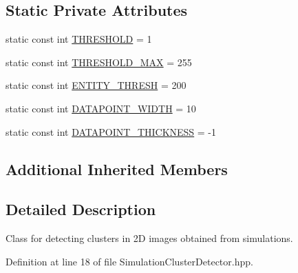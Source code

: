 \subsection*{Static Private Attributes}
\begin{DoxyCompactItemize}
\item 
static const int \hyperlink{classmultiscale_1_1analysis_1_1SimulationClusterDetector_a460525b4359afb52b4bde2ebd600122c}{T\-H\-R\-E\-S\-H\-O\-L\-D} = 1
\item 
static const int \hyperlink{classmultiscale_1_1analysis_1_1SimulationClusterDetector_a32b52c0ce7f8a1c8da872aa1cf754317}{T\-H\-R\-E\-S\-H\-O\-L\-D\-\_\-\-M\-A\-X} = 255
\item 
static const int \hyperlink{classmultiscale_1_1analysis_1_1SimulationClusterDetector_ad161524f0da7d2414e616fff59f02118}{E\-N\-T\-I\-T\-Y\-\_\-\-T\-H\-R\-E\-S\-H} = 200
\item 
static const int \hyperlink{classmultiscale_1_1analysis_1_1SimulationClusterDetector_a16d99d22863feed83960e6b9efe407a2}{D\-A\-T\-A\-P\-O\-I\-N\-T\-\_\-\-W\-I\-D\-T\-H} = 10
\item 
static const int \hyperlink{classmultiscale_1_1analysis_1_1SimulationClusterDetector_a530922a3fad1e612062d17d07e2dc763}{D\-A\-T\-A\-P\-O\-I\-N\-T\-\_\-\-T\-H\-I\-C\-K\-N\-E\-S\-S} = -\/1
\end{DoxyCompactItemize}
\subsection*{Additional Inherited Members}


\subsection{Detailed Description}
Class for detecting clusters in 2\-D images obtained from simulations. 

Definition at line 18 of file Simulation\-Cluster\-Detector.\-hpp.



